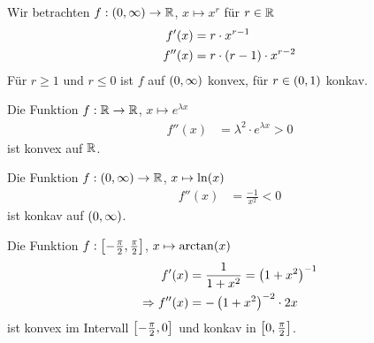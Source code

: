 \begin{beispiel}
    Wir betrachten $f: \left(0,\infty\right)\rightarrow{}\mathbb{R}$, $x\mapsto x^r$ für $r\in\mathbb{R}$
    \begin{align*}
        f'\of{x} &= r\cdot x^{r-1}\\
        f''(x) &= r\cdot\pair{r-1}\cdot x^{r-2}
    \end{align*}
    Für $r\geq 1$ und $r\leq 0$ ist $f$ auf $\left(0,\infty\right)$ konvex, für $r\in\left(0,1\right)$ konkav.
\end{beispiel}

\begin{beispiel}
    Die Funktion $f: \mathbb{R}\rightarrow{}\mathbb{R}$, $x\mapsto e^{\lambda x}$
    \begin{align*}
        f''(x) &= \lambda^2\cdot e^{\lambda x} > 0
    \end{align*}
    ist konvex auf $\mathbb{R}$.
\end{beispiel}

\begin{beispiel}
    Die Funktion $f: \left(0, \infty\right)\rightarrow{}\mathbb{R}$, $x\mapsto\ln\of{x}$
    \begin{align*}
        f''(x) &= \frac{-1}{x^2} < 0
    \end{align*}
    ist konkav auf $\left(0, \infty\right)$.
\end{beispiel}

\begin{beispiel}
    Die Funktion $f: \left[-\frac{\pi}{2}, \frac{\pi}{2}\right]$, $x\mapsto \arctan\of{x}$
    \begin{align*}
        f'(x) &= \frac{1}{1+x^2} = \left(1+x^2\right)^{-1}\\
        \Rightarrow{} f''(x) &= -\left(1+x^2\right)^{-2}\cdot 2x
    \end{align*}
    ist konvex im Intervall $\left[-\frac{\pi}{2}, 0\right]$ und konkav in $\left[0, \frac{\pi}{2}\right]$.
\end{beispiel}

